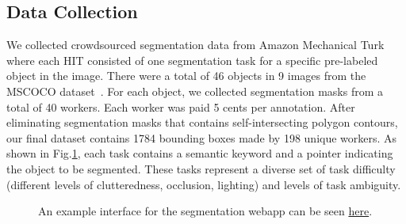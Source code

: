 \subsection{Data Collection\label{sec:data}}
We collected crowdsourced segmentation data 
from Amazon Mechanical Turk where each 
HIT consisted of one segmentation task 
for a specific pre-labeled object in the image. 
There were a total of 46 objects in 9 images from the MSCOCO dataset~\cite{Lin2014}. For each object, we collected segmentation masks from a total of 40 workers.  Each worker was paid 5 cents per annotation. After eliminating segmentation masks that contains self-intersecting polygon contours, our final dataset contains 1784 bounding boxes made by 198 unique workers. As shown in Fig.\ref{interface}, each task contains a semantic keyword and a pointer indicating the object to be segmented. These tasks represent a diverse set of task difficulty (different levels of clutteredness, occlusion, lighting) and levels of task ambiguity. 
\begin{figure}[ht!]
\centering
{}
\caption{An example interface for the segmentation webapp can be seen  \href{http://crowd-segment.herokuapp.com/segment/COCO_train2014_000000000127/10/}{here}.}
\label{interface}
\end{figure}

